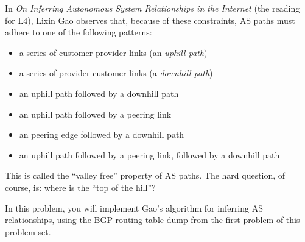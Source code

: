 \documentclass[11pt]{article}
\begin{document}
In {\em On Inferring Autonomous System Relationships in the Internet}
(the reading for L4), Lixin Gao observes that, because of these
constraints, AS paths must adhere to one of the following patterns:

\begin{itemize}
\itemsep=-1pt
\item a series of customer-provider links (an {\em uphill path})
\item a series of provider customer links (a {\em downhill path})
\item an uphill path followed by a downhill path
\item an uphill path followed by a peering link
\item an peering edge followed by a downhill path
\item an uphill path followed by a peering link, followed by a downhill
  path
\end{itemize}

This is called the ``valley free'' property of AS paths.  The hard
question, of course, is: where is the ``top of the hill''?  

In this problem, you will implement Gao's algorithm for inferring AS
relationships, using the BGP routing table dump from the first problem
of this problem set.

\setcounter{listcount}{0}
\end{document}
